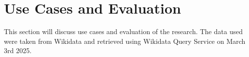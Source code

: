 \section{Use Cases and Evaluation}

This section will discuss use cases and evaluation of the research. The data used were taken from Wikidata and retrieved using Wikidata Query Service on March 3rd 2025.












